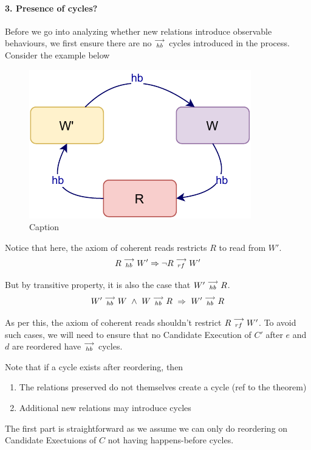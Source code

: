 
\paragraph{3. Presence of cycles?}
    Before we go into analyzing whether new relations introduce observable behaviours, we first ensure there are no $\stackrel{\longrightarrow}{_\textit{hb}}$ cycles introduced in the process. Consider the example below
    \begin{figure}[H]
        \centering
        \includegraphics[scale=0.7]{Q4(a).pdf}
        \caption{Caption}
        \label{fig:my_label}
    \end{figure}

    Notice that here, the axiom of coherent reads restricts $R$ to read from $W'$.
    \[
        R\stackrel{\longrightarrow}{_{hb}}W' \Rightarrow \neg R\stackrel{\longrightarrow}{_{rf}}W'
    \]

    But by transitive property, it is also the case that $W'\stackrel{\longrightarrow}{_{hb}}R$. 
    \[
        \reln{W'}{hb}{W} \ \wedge \ \reln{W}{hb}{R} \ 
        \Rightarrow \ 
        \reln{W'}{hb}{R}
    \]

    As per this, the axiom of coherent reads shouldn't restrict $R\stackrel{\longrightarrow}{_{rf}}W'$. To avoid such cases, we will need to ensure that no Candidate Execution of $C'$ after $e$ and $d$ are reordered have $\stackrel{\longrightarrow}{_{hb}}$ cycles.

    Note that if a cycle exists after reordering, then 
    \begin{enumerate}
        \item The relations preserved do not themselves create a cycle (ref to the theorem)
        \item Additional new relations may introduce cycles
    \end{enumerate}

    The first part is straightforward as we assume we can only do reordering on Candidate Exectuions of $C$ not having happens-before cycles. 

